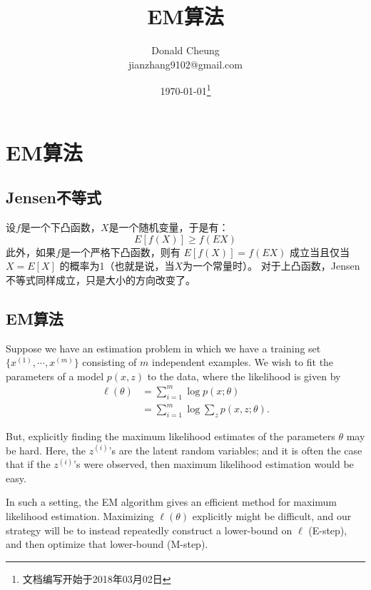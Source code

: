 \ifx\mlbook\undefined
    \providecommand{\pathroot}{../..}

    \title{EM算法}
    \author{Donald Cheung\\jianzhang9102@gmail.com}
    \date{\today\footnote{文档编写开始于2018年03月02日}}

    
\fi

\chapter{EM算法}

\section{Jensen不等式}

\begin{thm}
设$f$是一个下凸函数，$X$是一个随机变量，于是有：
\[
    E[f(X)] \ge f(EX)
\]
此外，如果$f$是一个严格下凸函数，则有 $E[f(X)] = f(EX)$ 成立当且仅当 $X=E[X]$ 的概率为1（也就是说，当$X$为一个常量时）。
对于上凸函数，Jensen不等式同样成立，只是大小的方向改变了。
\end{thm}


\section{EM算法}
    Suppose we have an estimation problem in which we have a training set $\{x^{(1)}, \cdots, x^{(m)}\}$ consisting of $m$ independent examples.
We wish to fit the parameters of a model $p(x, z)$ to the data, where the likelihood is given by
\begin{align*}
    \ell (\theta) &= \sum\limits_{i=1}^{m}{\log p(x;\theta)} \\
                  &= \sum\limits_{i=1}^{m}{\log \sum\limits_{z}{p(x,z; \theta)}}.
\end{align*}

    But, explicitly finding the maximum likelihood estimates of the parameters $\theta$ may be hard.
Here, the $z^{(i)}$'s are the latent random variables;
and it is often the case that if the $z^{(i)}$'s were observed, then maximum likelihood estimation would be easy.

    In such a setting, the EM algorithm gives an efficient method for maximum likelihood estimation.
Maximizing $\ell (\theta)$ explicitly might be difficult, and our strategy will be to instead
repeatedly construct a lower-bound on $\ell$ (E-step), and then optimize that lower-bound (M-step).

